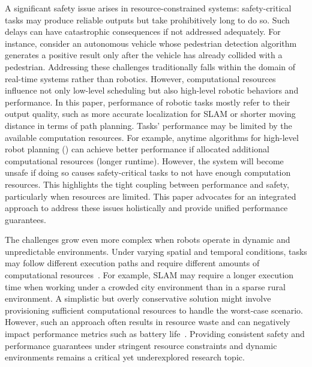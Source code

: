     A significant safety issue arises in resource-constrained systems: safety-critical tasks may produce reliable outputs but take prohibitively long to do so. Such delays can have catastrophic consequences if not addressed adequately. For instance, consider an autonomous vehicle whose pedestrian detection algorithm generates a positive result only after the vehicle has already collided with a pedestrian. Addressing these challenges traditionally falls within the domain of real-time systems rather than robotics. However, computational resources influence not only low-level scheduling but also high-level robotic behaviors and performance. 
    In this paper, performance of robotic tasks mostly refer to their output quality, such as more accurate localization for SLAM or shorter moving distance in terms of path planning.
    Tasks' performance may be limited by the available computation resources.
    For example, anytime algorithms for high-level robot planning (\eg \cite{Huang23ICRA_TSP}) can achieve better performance if allocated additional computational resources (\ie longer runtime). However, the system will become unsafe if doing so causes safety-critical tasks to not have enough computation resources. This highlights the tight coupling between performance and safety, particularly when resources are limited. This paper advocates for an integrated approach to address these issues holistically and provide unified performance guarantees.
	

    The challenges grow even more complex when robots operate in dynamic and unpredictable environments. Under varying spatial and temporal conditions, tasks may follow different execution paths and require different amounts of computational resources~\cite{Ash23RAL, Sifat2021TowardsCA}. 
    For example, SLAM may require a longer execution time when working under a crowded city environment than in a sparse rural environment. 
    A simplistic but overly conservative solution might involve provisioning sufficient computational resources to handle the worst-case scenario. However, such an approach often results in resource waste and can negatively impact performance metrics such as battery life~\cite{Maxim2022ProbabilisticA}. Providing consistent safety and performance guarantees under stringent resource constraints and dynamic environments remains a critical yet underexplored research topic.

